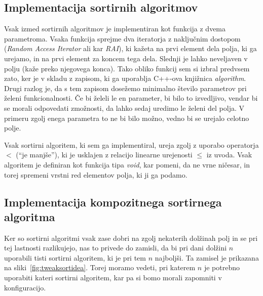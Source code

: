 \documentclass[a4paper,oneside,12pt]{article}
\begin{document}
\subsection{Implementacija sortirnih algoritmov}
\label{chapter:sortimplementation}
Vsak izmed sortirnih algoritmov je implementiran kot funkcija z dvema parametroma.
Vsaka funkcija sprejme dva iteratorja z naključnim dostopom (\emph{Random Access
Iterator} ali kar \emph{RAI}),
ki kažeta na prvi element dela polja, ki ga urejamo, in na prvi element za koncem tega dela.
Slednji je lahko neveljaven v polju (kaže preko njegovega konca).
Tako obliko funkcij sem si izbral predvsem zato, ker je v skladu z zapisom, ki ga uporablja
\mbox{C++-ova} knjižnica \emph{algorithm}. Drugi razlog je, da s tem zapisom dosežemo minimalno število
parametrov pri želeni funkcionalnosti. Če bi želeli le en parameter, bi bilo to
izvedljivo, vendar bi se morali odpovedati zmožnosti, da lahko sedaj uredimo le želeni
del polja. V primeru zgolj enega parametra to ne bi bilo možno, vedno bi se
urejalo celotno polje.

Vsak sortirni algoritem, ki sem ga implementiral, ureja zgolj z uporabo operatorja $<$
(``je manjše''), ki je usklajen z relacijo linearne urejenosti $\leq$ iz uvoda. Vsak
algoritem je definiran kot funkcija tipa \emph{void}, kar pomeni, da ne vrne ničesar, in
torej spremeni vrstni red elementov polja, ki ji ga podamo.

\subsection{Implementacija kompozitnega sortirnega algoritma}
\label{chapter:tweaksort}
Ker so sortirni algoritmi vsak zase dobri na zgolj nekaterih dolžinah polj in se pri tej
lastnosti razlikujejo, nas to privede do zamisli, da bi pri dani dolžini $n$ uporabili tisti
sortirni algoritem, ki je pri tem $n$ najboljši. Ta zamisel je prikazana na sliki~\ref{fig:tweaksortidea}.
Torej moramo vedeti, pri katerem $n$ je
potrebno uporabiti kateri sortirni algoritem, kar pa si bomo morali zapomniti
v konfiguracijo.%
\end{document}
